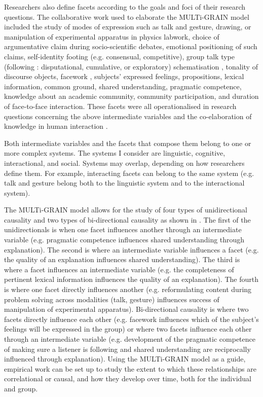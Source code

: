 \documentclass[output=paper]{langscibook}
\begin{document}
Researchers also define facets according to the goals and foci of their research questions. The collaborative work used to elaborate the MULTi-GRAIN model included the study of modes of expression such as talk and gesture, drawing, or manipulation of experimental apparatus in physics labwork, choice of argumentative claim during socio-scientific debates, emotional positioning of such claims, self-identity footing (e.g. consensual, competitive), group talk type (following \citealt{WegerifMercer1997}: disputational, cumulative, or exploratory) schematisation \citep{Grize1996}, tonality of discourse objects, facework \citep{Goffman1967}, subjects’ expressed feelings, propositions, lexical information, common ground, shared understanding, pragmatic competence, knowledge about an academic community, community participation, and duration of face-to-face interaction. These facets were all operationalised in research questions concerning the above intermediate variables and the co-elaboration of knowledge in human interaction \citep{Lund2016,LundBécu-Robinault2013,PoloEtAl2016,Mazur-PalandreEtAl2014,EberleEtAl2021}.

Both intermediate variables and the facets that compose them belong to one or more complex systems. The systems I consider are linguistic, cognitive, interactional, and social. Systems may overlap, depending on how researchers define them. For example, interacting facets can belong to the same system (e.g. talk and gesture belong both to the linguistic system and to the interactional system).

The MULTi-GRAIN model allows for the study of four types of unidirectional causality and two types of bi-directional causality as shown in . The first of the unidirectionals is when one facet influences another through an intermediate variable (e.g. pragmatic competence influences shared understanding through explanation). The second is where an intermediate variable influences a facet (e.g. the quality of an explanation influences shared understanding). The third is where a facet influences an intermediate variable (e.g. the completeness of pertinent lexical information influences the quality of an explanation). The fourth is where one facet directly influences another (e.g. reformulating content during problem solving across modalities (talk, gesture) influences success of manipulation of experimental apparatus). Bi-directional causality is where two facets directly influence each other (e.g. facework influences which of the subject’s feelings will be expressed in the group) or where two facets influence each other through an intermediate variable (e.g. development of the pragmatic competence of making sure a listener is following and shared understanding are reciprocally influenced through explanation). Using the MULTi-GRAIN model as a guide, empirical work can be set up to study the extent to which these relationships are correlational or causal, and how they develop over time, both for the individual and group.
\end{document}
